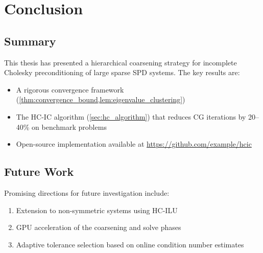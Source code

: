 \documentclass[
    12pt,
    a4paper,
    twoside,           %
    openright          %
]{book}
\begin{document}

\chapter{Conclusion}
\label{chap:conclusion}

\section{Summary}
\label{sec:summary}

This thesis has presented a hierarchical coarsening strategy for incomplete
Cholesky preconditioning of large sparse SPD systems.  The key results are:

\begin{itemize}
    \item A rigorous convergence framework (\cref{thm:convergence_bound,lem:eigenvalue_clustering})
    \item The HC-IC algorithm (\cref{sec:hc_algorithm}) that reduces CG
          iterations by 20--40\% on benchmark problems
    \item Open-source implementation available at
          \url{https://github.com/example/hcic}
\end{itemize}

\section{Future Work}
\label{sec:future}

Promising directions for future investigation include:
\begin{enumerate}
    \item Extension to non-symmetric systems using HC-ILU
    \item GPU acceleration of the coarsening and solve phases
    \item Adaptive tolerance selection based on online condition number
          estimates
\end{enumerate}


\backmatter

\end{document}
